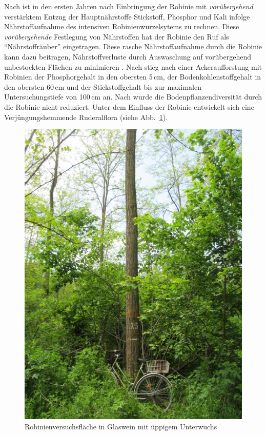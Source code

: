 \documentclass[twocolumn]{scrartcl}
\begin{document}
Nach \citet{mueller1991robinie} ist in den
ersten Jahren nach Einbringung der Robinie mit \emph{vorübergehend}
verstärktem Entzug der Hauptnährstoffe Stickstoff, Phosphor und Kali
infolge Nährstoffaufnahme des intensiven Robinienwurzelsytems zu
rechnen. Diese \emph{vorübergehende} Festlegung von Nährstoffen hat
der Robinie den Ruf als \enquote{Nährstoffräuber} eingetragen.
Diese rasche Nährstoffaufnahme durch die Robinie kann dazu beitragen,
Nährstoffverluste durch Auswaschung auf vorübergehend unbestockten
Flächen zu minimieren \citep{boring1984robinie}.
Nach \citet{kou2016robinieBoden} stieg nach einer Ackeraufforstung mit
Robinien der Phosphorgehalt in den obersten 5\,cm, der
Bodenkohlenstoffgehalt in den obersten 60\,cm und der Stickstoffgehalt
bis zur maximalen Untersuchungstiefe von 100\,cm an.
Nach \citet{sitzia2012robinie} wurde die Bodenpflanzendiversität durch
die Robinie nicht reduziert. Unter dem Einfluss der Robinie entwickelt
sich eine Verjüngungshemmende Ruderalflora (siehe
Abb.~\ref{fig:glaswein}).

\begin{figure}[htbp]
  \centering
  \includegraphics[width=.9\linewidth]{./bild/GlasweinRobinie2023a}
  \caption{Robinienversuchsfläche in Glaswein mit üppigem Unterwuchs}
  \label{fig:glaswein}
\end{figure}
\end{document}
